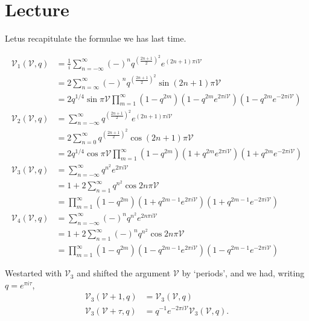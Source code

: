 \chapter{Lecture}\label{part2:lec10} %

Let\pageoriginale us recapitulate the formulae we has last time.

\begin{align*}
  \mathscr{V}_1 (\mathscr{V}, q) & = \frac{1}{i} \sum^\infty_{n=-
    \infty} (-)^n q^{\left( \frac{2n+1}{2}\right)^2} e^{(2n+1)\pi i
    \mathscr{V}}\\
  & = 2\sum^\infty_{n= \infty} (-)^n q^{\left(\frac{2n+1}{2}\right)^2} 
  \sin(2n+1) \pi \mathscr{V}\\
  & = 2 q^{1/4} \sin \pi \mathscr{V} \prod^\infty_{m=1} \left(1-
  q^{2m}\right)\left(1-q^{2m} e^{2 \pi i \mathscr{V}}\right)\left(1-
  q^{2m} e^{- 2 \pi i \mathscr{V}}\right) \tag{1}\label{part2:lec10:eq1}\\
  \mathscr{V}_2 (\mathscr{V}, q) & = \sum^\infty_{n=-
    \infty} q^{\left( \frac{2n+1}{2}\right)^2} e^{(2n+1)\pi i
    \mathscr{V}}\\
  & = 2\sum^\infty_{n= 0} q^{\left(\frac{2n+1}{2}\right)^2} 
  \cos(2n+1) \pi \mathscr{V}\\
  & = 2 q^{1/4} \cos \pi \mathscr{V} \prod^\infty_{m=1} \left(1-
  q^{2m}\right)\left(1+q^{2m} e^{2 \pi i \mathscr{V}}\right)\left(1+
  q^{2m} e^{- 2 \pi i \mathscr{V}}\right) \tag{2}\label{part2:lec10:eq2}\\  
  \mathscr{V}_3 (\mathscr{V}, q) & = \sum^\infty_{n=-
    \infty} q^{n^2} e^{2 \pi i \mathscr{V}}\\
  & = 1+2 \sum^\infty_{n= 1} q^{n^2} \cos 2n \pi \mathscr{V}\\
  & = \prod^\infty_{m=1} \left(1-
  q^{2m}\right) \left(1+q^{2m-1} e^{2 \pi i \mathscr{V}}\right)\left(1+
  q^{2m-1} e^{-2 \pi i \mathscr{V}}\right) \tag{3}\label{part2:lec10:eq3}\\
  \mathscr{V}_4 (\mathscr{V}, q) &= \sum^\infty_{n=-\infty} (-)^n
  q^{n^2} e^{2n \pi i \mathscr{V}}\\
  & = 1+ 2 \sum^\infty_{n=1} (-)^n q^{n^2} \cos 2n \pi \mathscr{V}\\
  & = \prod^\infty_{m=1} (1-q^{2m})(1- q^{2m-1}e^{2 \pi i
    \mathscr{V}})(1-q^{2m-1}e^{-2 \pi i \mathscr{V}}) \tag{4}\label{part2:lec10:eq4}
\end{align*}

We\pageoriginale started with $\mathscr{V}_3$ and shifted the
argument $\mathscr{V}$ by `periods', and we had, writing $q= e^{\pi i
  \tau}$, 
\begin{equation*}
  \begin{aligned}
    \mathscr{V}_3 (\mathscr{V}+ 1, q) & = \mathscr{V}_3 (\mathscr{V},
    q)\\
    \mathscr{V}_3 (\mathscr{V}+\tau, q)& = q^{-1} e^{-2 \pi i
      \mathscr{V}} \mathscr{V}_3 (\mathscr{V}, q).
  \end{aligned}\tag{5}\label{part2:lec10:eq5}
\end{equation*}

